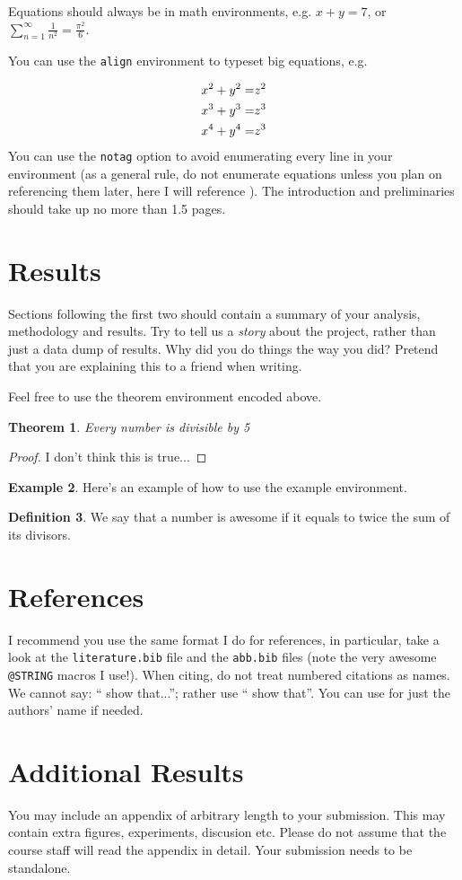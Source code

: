 \documentclass{article}
\newtheorem{theorem}{Theorem}[section]
\theoremstyle{definition}
\newtheorem{definition}[theorem]{Definition}
\newtheorem{example}[theorem]{Example}
\begin{document}
Equations should always be in math environments, e.g. $x+y = 7$, or $\sum_{n = 1}^\infty \frac1{n^2} = \frac{\pi^2}{6}$.

You can use the \texttt{align} environment to typeset big equations, e.g.

\begin{align}
    x^2+y^2 =& z^2\notag\\
    x^3 + y^3 = & z^3 \notag\\
    x^4+y^4 = & z^3 \label{eq:someequation}
\end{align}
You can use the \texttt{notag} option to avoid enumerating every line in your environment (as a general rule, do not enumerate equations unless you plan on referencing them later, here I will reference ). 
The introduction and preliminaries should take up no more than 1.5 pages.
\section{Results}
Sections following the first two should contain a summary of your analysis, methodology and results. Try to tell us a \emph{story} about the project, rather than just a data dump of results. Why did you do things the way you did? Pretend that you are explaining this to a friend when writing.

Feel free to use the theorem environment encoded above.
\begin{theorem}
    Every number is divisible by 5
\end{theorem}
\begin{proof}
    I don't think this is true...
\end{proof}

\begin{example}
    Here's an example of how to use the example environment.
\end{example}

\begin{definition}
    We say that a number is awesome if it equals to twice the sum of its divisors.
\end{definition}
\section{References}
I recommend you use the same format I do for references, in particular, take a look at the \texttt{literature.bib} file and the \texttt{abb.bib} files (note the very awesome \texttt{@STRING} macros I use!). 
When citing, do not treat numbered citations as names. We cannot say: ``\cite{Caragiannis2016MNW} show that...''; rather use ``\citet{Caragiannis2016MNW} show that''. You can use \citeauthor{Caragiannis2016MNW} for just the authors' name if needed. 



\appendix
\section{Additional Results}
You may include an appendix of arbitrary length to your submission. This may contain extra figures, experiments, discusion etc. Please do not assume that the course staff will read the appendix in detail. Your submission needs to be standalone.
\end{document}
